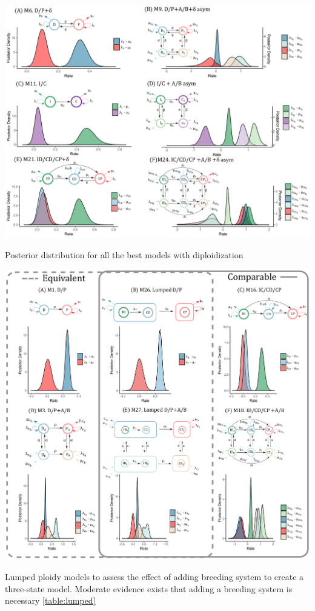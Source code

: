 \begin{suppfigure}
\includegraphics[width=\textwidth]{alldiversificationasymhiddendip.pdf}
\caption{Posterior distribution for all the best models with diploidization} %
\label{suppfigure:alldip}
\end{suppfigure}

\begin{suppfigure}
\includegraphics[width=\textwidth]{comparablesDP.pdf}
\caption{Lumped ploidy models to assess the effect of adding breeding system to create a three-state model. Moderate evidence exists that adding a breeding system is necessary \cref{table:lumped} } %
\label{suppfigure:lumpedDP}
\end{suppfigure}

